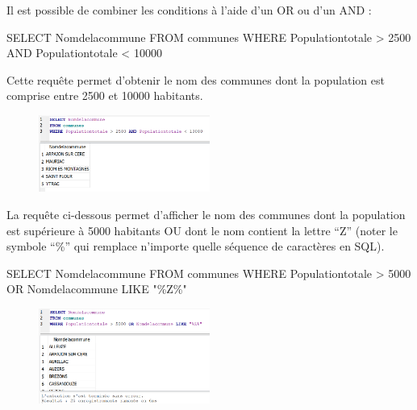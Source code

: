 \documentclass[
  letterpaper,
  DIV=11,
  numbers=noendperiod]{scrartcl}
\newenvironment{Shaded}{\begin{snugshade}}{\end{snugshade}}
\newcommand{\DecValTok}[1]{\textcolor[rgb]{0.68,0.00,0.00}{#1}}
\newcommand{\KeywordTok}[1]{\textcolor[rgb]{0.00,0.23,0.31}{#1}}
\newcommand{\NormalTok}[1]{\textcolor[rgb]{0.00,0.23,0.31}{#1}}
\newcommand{\OperatorTok}[1]{\textcolor[rgb]{0.37,0.37,0.37}{#1}}
\newcommand{\OtherTok}[1]{\textcolor[rgb]{0.00,0.23,0.31}{#1}}
\begin{document}
Il est possible de combiner les conditions à l'aide d'un OR ou d'un AND
:

\begin{Shaded}
\begin{Highlighting}[]
\KeywordTok{SELECT}\NormalTok{ Nomdelacommune}
\KeywordTok{FROM}\NormalTok{ communes}
\KeywordTok{WHERE}\NormalTok{ Populationtotale }\OperatorTok{\textgreater{}} \DecValTok{2500} \KeywordTok{AND}\NormalTok{ Populationtotale }\OperatorTok{\textless{}} \DecValTok{10000}
\end{Highlighting}
\end{Shaded}

Cette requête permet d'obtenir le nom des communes dont la population
est comprise entre 2500 et 10000 habitants.

\begin{figure}

{\centering \includegraphics[width=0.5\textwidth,height=\textheight]{SQL3.png}

}

\end{figure}

La requête ci-dessous permet d'afficher le nom des communes dont la
population est supérieure à 5000 habitants OU dont le nom contient la
lettre ``Z'' (noter le symbole ``\%'' qui remplace n'importe quelle
séquence de caractères en SQL).

\begin{Shaded}
\begin{Highlighting}[]
\KeywordTok{SELECT}\NormalTok{ Nomdelacommune}
\KeywordTok{FROM}\NormalTok{ communes}
\KeywordTok{WHERE}\NormalTok{ Populationtotale }\OperatorTok{\textgreater{}} \DecValTok{5000} \KeywordTok{OR}\NormalTok{ Nomdelacommune }\KeywordTok{LIKE} \OtherTok{"\%Z\%"}
\end{Highlighting}
\end{Shaded}

\begin{figure}

{\centering \includegraphics[width=0.5\textwidth,height=\textheight]{SQL4.png}

}

\end{figure}
\end{document}
